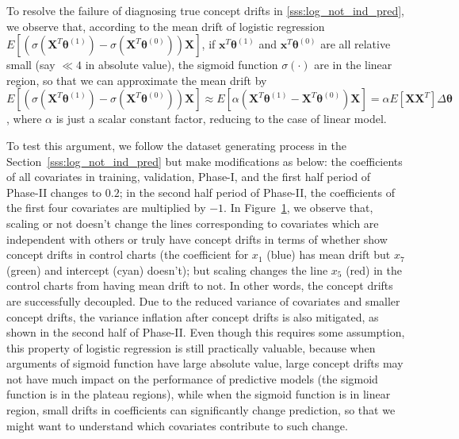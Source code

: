 \documentclass[twoside,11pt]{article}
\begin{document}
\begin{enumerate}[(I)]
\begin{figure}[!htbp]
{%
}
  \label{fig:log_reg_not_ind_X_1}
\end{figure}

To resolve the failure of diagnosing true concept drifts in \ref{sss:log_not_ind_pred}, we observe that, according to the mean drift of logistic regression $E [ (\sigma (\bm {X}^T\bm { \theta}^{ (1)}) - \sigma ( \bm {X}^T\bm { \theta}^{ (0)})) \bm {X}] $, if $ \bm {x}^T\bm { \theta}^{ (1)}$ and $ \bm {x}^T\bm { \theta}^{ (0)}$ are all relative small (say $\ll 4$ in absolute value), the sigmoid function $ \sigma (\cdot)$ are in the linear region, so that we can approximate the mean drift by $E [ (\sigma ( \bm {X}^T\bm { \theta}^{ (1)} ) - \sigma ( \bm {X}^T\bm { \theta}^{ (0)} )) \bm {X}] \approx E [ \alpha( \bm {X}^T\bm { \theta}^{ (1)} -  \bm {X}^T\bm { \theta}^{ (0)} ) \bm {X}] = \alpha E[\bm{XX}^T] \Delta \bm { \theta} $, where $ \alpha$ is just a scalar constant factor, reducing to the case of linear model.  

To test this argument, we follow the dataset generating process in the Section~\ref{sss:log_not_ind_pred} but make modifications as below: the coefficients of all covariates in training, validation, Phase-I, and the first half period of Phase-II changes to $0.2$; in the second half period of Phase-II, the coefficients of the first four covariates are multiplied by $-1$. In Figure~\ref{fig:log_reg_not_ind_X_1}, we observe that, scaling or not doesn't change the lines corresponding to covariates which are independent with others or truly have concept drifts in terms of whether show concept drifts in control charts (the coefficient for $x_1$ (blue) has mean drift but $x_7$ (green) and intercept (cyan) doesn't); but scaling changes the line $x_5$ (red) in the control charts from having mean drift to not. In other words, the concept drifts are successfully decoupled. Due to the reduced variance of covariates and smaller concept drifts, the variance inflation after concept drifts is also mitigated, as shown in the second half of Phase-II. Even though this requires some assumption, this property of logistic regression is still practically valuable, because when arguments of sigmoid function have large absolute value, large concept drifts may not have much impact on the performance of predictive models (the sigmoid function is in the plateau regions), while when the sigmoid function is in linear region, small drifts in coefficients can significantly change prediction, so that we might want to understand which covariates contribute to such change. 


\end{enumerate}
\end{document}
